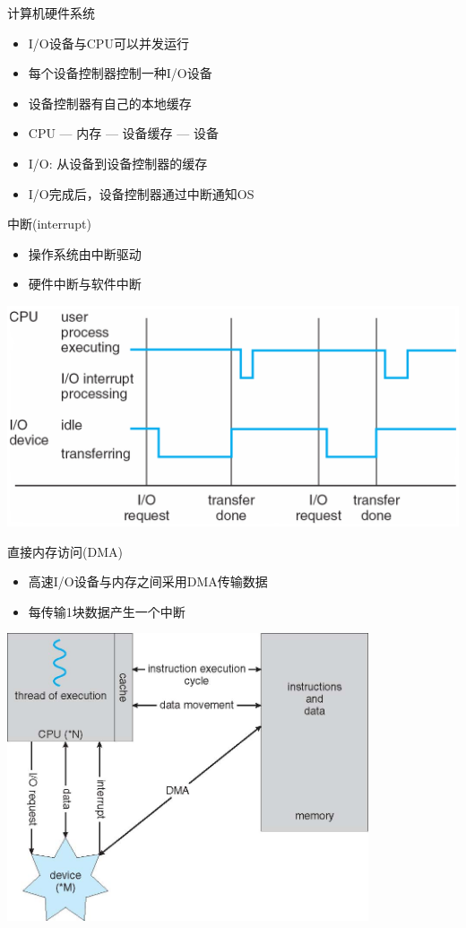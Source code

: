 \documentclass[xcolor=svgnames]{beamer}
\begin{document}
\begin{CJK*}{UTF8}{gbsn}
\begin{frame}{计算机硬件系统}
\begin{itemize}
\item I/O设备与CPU可以并发运行
\item 每个设备控制器控制一种I/O设备
\item 设备控制器有自己的本地缓存
\item CPU --- 内存 --- 设备缓存 --- 设备
\item I/O: 从设备到设备控制器的缓存
\item I/O完成后，设备控制器通过\alert{中断}通知OS
\end{itemize}
\end{frame}

\begin{frame}{中断(interrupt)}
\begin{itemize}
\item 操作系统由中断驱动
\item 硬件中断与软件中断
\end{itemize}
\includegraphics[width=1.0\textwidth]{interrupt.png}
\end{frame}

\begin{frame}{直接内存访问(DMA)}
\begin{itemize}
\item 高速I/O设备与内存之间采用DMA传输数据
\item 每传输1块数据产生一个中断
\end{itemize}
\includegraphics[width=0.8\textwidth]{vonneumann.jpg}
\end{frame}


\end{CJK*}
\end{document}

